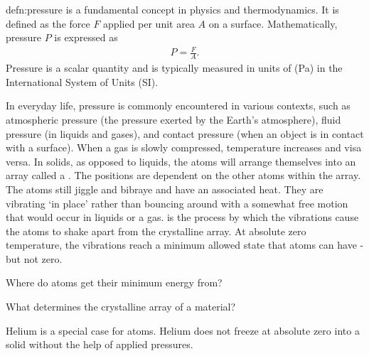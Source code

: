 \begin{defn}[Pressure]{defn:pressure}
	 is a fundamental concept in physics and thermodynamics. It is defined as the force $F$ applied per unit area $A$ on a surface. Mathematically, pressure $P$ is expressed as 
	\begin{align}
		P=\frac{F}{A}.
	\end{align}
	Pressure is a scalar quantity and is typically measured in units of  (Pa) in the International System of Units (SI). 
\end{defn}

In everyday life, pressure is commonly encountered in various contexts, such as atmospheric pressure (the pressure exerted by the Earth's atmosphere), fluid pressure (in liquids and gases), and contact pressure (when an object is in contact with a surface). When a gas is slowly compressed, temperature increases and visa versa. In solids, as opposed to liquids, the atoms will arrange themselves into an array called a . The positions are dependent on the other atoms within the array. The atoms still jiggle and bibraye and have an associated heat. They are vibrating `in place' rather than bouncing around with a somewhat free motion that would occur in liquids or a gas.  is the process by which the vibrations cause the atoms to shake apart from the crystalline array. At absolute zero temperature, the vibrations reach a minimum allowed state that atoms can have - but not zero. 

\begin{questions}
	\item Where do atoms get their minimum energy from?
	\item What determines the crystalline array of a material?
\end{questions}

\begin{interestnote}
	Helium is a special case for atoms. Helium does not freeze at absolute zero into a solid without the help of applied pressures. 
\end{interestnote}

